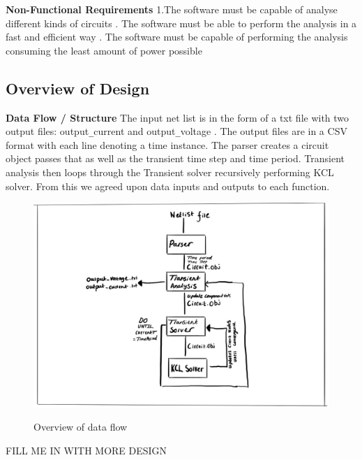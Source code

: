 \documentclass{article}
\begin{document}
\bigbreak

\textbf{Non-Functional Requirements}
\newline
1.The software must be capable of analyse different kinds of circuits
. The software must be able to perform the analysis in a fast and efficient way
. The software must be capable of performing the analysis consuming the least amount of power possible

\newpage

\subsection{Overview of Design}
\textbf{Data Flow / Structure}
\newline
The input net list is in the form of a txt file with two output files: output\verb|_|current and output\verb|_|voltage . The output files are in a CSV format with each line denoting a time instance. The parser creates a circuit object passes that as well as the transient time step and time period. Transient analysis then loops through the Transient solver recursively performing KCL solver. From this we agreed upon data inputs and outputs to each function.

\begin{figure}[h]
    \caption{Overview of data flow}
    \centering
    \includegraphics[width=\textwidth]{images/Comphpp.jpg}
    \label{fig:AlgoOverview}
\end{figure}

FILL ME IN WITH MORE DESIGN

\newpage
\end{document}
